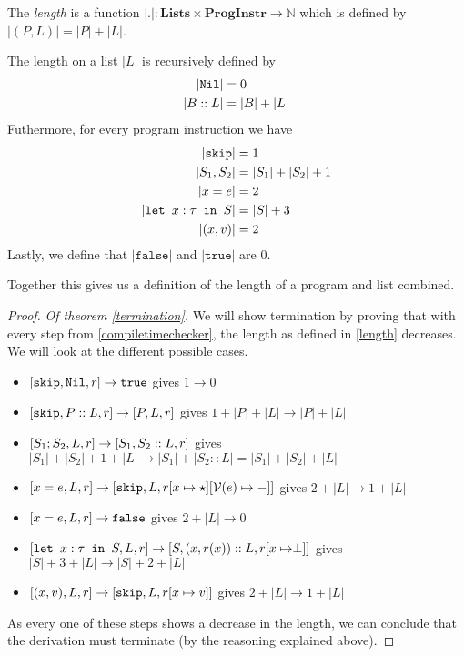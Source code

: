 \begin{definition}
\label{length}
The \emph{length} is a function $|.|: \textbf{Lists} \times \textbf{ProgInstr} \to \mathbb{N}$ which is defined by $|(P,L)| = |P|+|L|$.

The length on a list $|L|$ is recursively defined by 
\begin{align*}
|\texttt{Nil}| & = 0\\
|B::L| & = |B| + |L|
\end{align*}
Futhermore, for every program instruction we have
\begin{align*}
|\texttt{skip}| & = 1\\
|S_1, S_2| & = |S_1| + |S_2| + 1 \\
|x=e| & = 2\\
|\texttt{let }x : \tau \texttt{ in } S| & = |S| + 3 \\
|(x,v)| & = 2 \\
\end{align*}
Lastly, we define that $|\texttt{false}|$ and $|\texttt{true}|$ are 0.

Together this gives us a definition of the length of a program and list combined.
\end{definition}

\begin{proof}
\emph{Of theorem \ref{termination}.}
We will show termination by proving that with every step from \ref{compiletimechecker}, the length as defined in \ref{length} decreases. We will look at the different possible cases.

\begin{itemize}[noitemsep]
    \item $[ \texttt{skip}, \texttt{Nil}, r ] \to \texttt{true}$ gives $1 \to 0$
    \item $[ \texttt{skip}, P::L,  r ] \to [ P, L, r ]$ gives $1 + |P| + |L| \to |P| + |L|$
    \item $[ S_1; S_2, L, r ] \to [ S_1, S_2::L, r ]$ gives $|S_1| + |S_2| + 1 + |L| \to |S_1| + |S_2::L| = |S_1| + |S_2| + |L|$
    \item $[ x=e, L, r ] \to [ \texttt{skip}, L, r[x\mapsto \star][\mathcal{V}(e) \mapsto -] ]$ gives $2 + |L| \to 1 + |L|$
    \item $[ x=e, L, r ] \to \texttt{false}$ gives $2 + |L| \to 0$
    \item $[ \texttt{let }x : \tau \texttt{ in } S, L, r ] \to [ S, (x,r(x))::L, r[x\mapsto \perp] ]$ gives $|S|+3+|L|\to |S|+2+|L|$
    \item $[ (x,v), L, r ] \to [ \texttt{skip}, L, r[x \mapsto v] ]$ gives $2 + |L| \to 1 + |L|$
\end{itemize}
As every one of these steps shows a decrease in the length, we can conclude that the derivation must terminate (by the reasoning explained above).
\end{proof}


